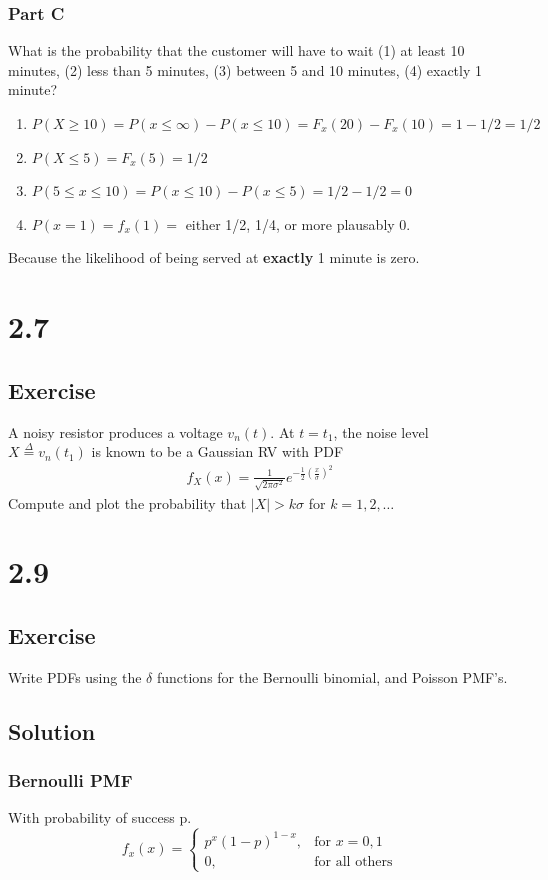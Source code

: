 \documentclass[12pt]{article}
\begin{document}
\subsubsection{Part C}
What is the probability that the customer will have to wait (1) at least 10 minutes, (2) less than 5 minutes, (3) between
5 and 10 minutes, (4) exactly 1 minute?

\begin{enumerate}
\item $P(X\geq10)=P(x\leq \infty)-P(x\leq10)=F_x(20)-F_x(10)=1-1/2=1/2$
\item $P(X\leq5)=F_x(5)=1/2$
\item $P(5\leq x \leq 10)=P(x\leq 10) -P(x\leq5)=1/2-1/2=0$
\item $P(x=1)=f_x(1)=$ either 1/2, 1/4, or more plausably 0.
\end{enumerate}

Because the likelihood of being served at {\bfseries exactly} 1 minute is zero.


\section{2.7} 
\subsection{Exercise}
A noisy resistor produces a voltage $v_n(t)$. At $t=t_1$, the noise level $X\stackrel{\Delta}{=}v_n(t_1)$ is known to be 
a Gaussian RV with PDF\\
\begin{align*}
f_X(x)=\frac{1}{\sqrt{2\pi\sigma^2}}e^{-\frac{1}{2}(\frac{x}{\sigma})^2}
\end{align*}
Compute and plot the probability that $|X|>k\sigma$ for $k=1,2,\ldots$






\section{2.9}
\subsection{Exercise}
Write PDFs using the $\delta$ functions for the Bernoulli binomial, and Poisson PMF's.
\subsection{Solution}
\subsubsection{Bernoulli PMF}
With probability of success p.
\begin{equation*} f_x(x)=
  \begin{cases}
    p^x(1-p)^{1-x},  & \text{for } x=0, 1 \\
    0, & \text{for all others}
  \end{cases}
\end{equation*}
\end{document}
